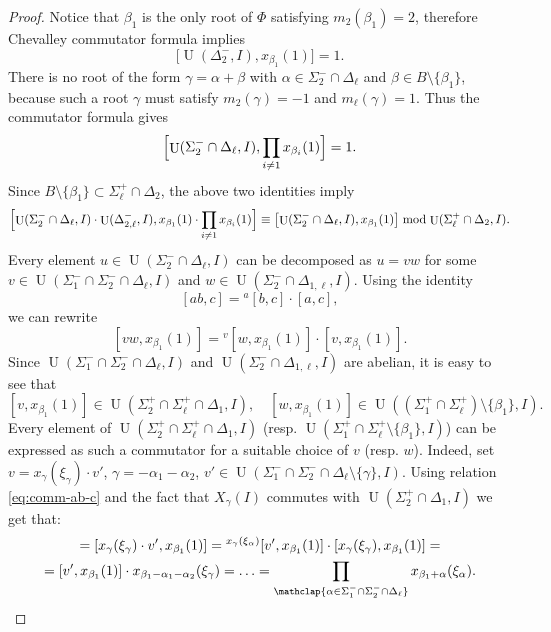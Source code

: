 \documentclass[11pt]{amsart}
\theoremstyle{plain}
\numberwithin{equation}{section}
\numberwithin{lemma}{section}
\theoremstyle{definition}
\theoremstyle{remark}
\DeclareMathOperator{\U}{U}
\begin{document}
\begin{proof}
Notice that $\beta_1$ is the only root of $\Phi$ satisfying $m_2(\beta_1)=2$, therefore Chevalley commutator formula implies
\[ \bigl[\U(\Delta_2^-, I), x_{\beta_1}(1)\bigr]=1. \]
There is no root of the form $\gamma=\alpha+\beta$ with $\alpha\in\Sigma_2^-\cap\Delta_\ell$ and $\beta\in B\setminus\{\beta_1\}$, because such a root $\gamma$ must satisfy $m_2(\gamma)=-1$ and $m_\ell(\gamma)=1$. Thus the commutator formula gives
\[\Bigl[\U(\Sigma_2^-\cap\Delta_\ell, I), \prod_{i\neq1}x_{\beta_i}(1)\Bigr]=1. \]
Since $B\setminus\{\beta_1\}\subset\Sigma_\ell^+\cap\Delta_2$, the above two identities imply
\[
\Bigl[ \U(\Sigma_2^-\cap\Delta_\ell, I)\cdot\U(\Delta_{2, \ell}^-, I), x_{\beta_1}(1)\cdot\prod_{i\neq1}x_{\beta_i}(1) \Bigr]
\equiv \bigl[ \U(\Sigma_2^-\cap\Delta_\ell, I), x_{\beta_1}(1) \bigr] \bmod \U(\Sigma_\ell^+\cap\Delta_2, I).
\]
Every element $u\in\U(\Sigma_2^-\cap\Delta_\ell, I)$ can be decomposed as $u=vw$ for some $v\in\U(\Sigma_1^-\cap\Sigma_2^-\cap\Delta_\ell, I)$ and $w\in\U(\Sigma_2^-\cap\Delta_{1, \ell}, I)$.
Using the identity
\begin{equation}\label{eq:comm-ab-c}
[ab, c]={}^a[b, c]\cdot[a, c], 
\end{equation}
we can rewrite
\[ [vw, x_{\beta_1}(1)] = {}^v[w, x_{\beta_1}(1)]\cdot[v, x_{\beta_1}(1)].  \]
Since $\U(\Sigma_1^-\cap\Sigma_2^-\cap\Delta_\ell, I)$ and $\U(\Sigma_2^-\cap\Delta_{1, \ell}, I)$ are abelian, it is easy to see that
\[ [v, x_{\beta_1}(1)]\in\U(\Sigma_2^+\cap\Sigma_\ell^+\cap\Delta_1, I), \quad [w, x_{\beta_1}(1)]\in\U((\Sigma_1^+\cap\Sigma_\ell^+)\setminus\{\beta_1\}, I). \]
Every element of $\U(\Sigma_2^+\cap\Sigma_\ell^+\cap\Delta_1, I)$ (resp. $\U(\Sigma_1^+\cap\Sigma_\ell^+\setminus\{\beta_1\}, I)$) can be expressed as such a commutator for a suitable choice of $v$ (resp. $w$).
Indeed, set $v=x_\gamma(\xi_\gamma)\cdot v'$, $\gamma=-\alpha_1-\alpha_2$, $v' \in \U(\Sigma_1^- \cap \Sigma_2^- \cap \Delta_\ell \setminus \{\gamma\}, I)$.
Using relation \eqref{eq:comm-ab-c} and the fact that $X_\gamma(I)$ commutes with $\U(\Sigma_2^+\cap\Delta_1, I)$ we get that:
\begin{multline*}
[v, x_{\beta_1}(1)] = [x_\gamma(\xi_\gamma)\cdot v', x_{\beta_1}(1)] = {}^{x_\gamma(\xi_\alpha)}[v', x_{\beta_1}(1)] \cdot [x_\gamma(\xi_\gamma), x_{\beta_1}(1)] = \\
= [v', x_{\beta_1}(1)]\cdot x_{\beta_1-\alpha_1-\alpha_2}(\xi_\gamma) = \ldots = \prod_{\mathclap{\alpha\in\Sigma_1^- \cap \Sigma_2^- \cap \Delta_\ell}} x_{\beta_1+\alpha}(\xi_\alpha).
 \end{multline*}

\end{proof}
\end{document}
